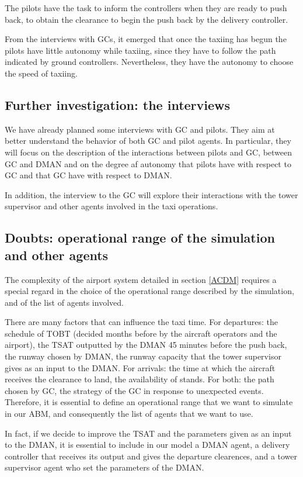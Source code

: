 \documentclass{article}
\begin{document}
The pilots have the task to inform the controllers when they are ready to push back, to obtain the clearance to begin the push back by the delivery controller.

From the interviews with GCs, it emerged that once the taxiing has begun the pilots have little autonomy while taxiing, since they have to follow the path indicated by ground controllers.
Nevertheless, they have the autonomy to choose the speed of taxiing.

\subsection{Further investigation: the interviews}
We have already planned some interviews with GC and pilots. 
They aim at better understand the behavior of both GC and pilot agents. In particular, they will focus on the description of the interactions between pilots and GC, between GC and DMAN and on the degree af autonomy that pilots have with respect to GC and that GC have with respect to DMAN. 

In addition, the interview to the GC will explore their interactions with the tower supervisor and other agents involved in the taxi operations.

\subsection{Doubts: operational range of the simulation and other agents}\label{other-agents}
The complexity of the airport system detailed in section \ref{ACDM} requires a special regard in the choice of the operational range described by the simulation, and of the list of agents involved.

There are many factors that can influence the taxi time. For departures: the schedule of TOBT (decided months before by the aircraft operators and the airport), the TSAT outputted by the DMAN 45 minutes before the push back, the runway chosen by DMAN, the runway capacity that the tower supervisor gives as an input to the DMAN. For arrivals: the time at which the aircraft receives the clearance to land, the availability of stands. For both: the path chosen by GC, the strategy of the GC in response to unexpected events.
Therefore, it is essential to define an operational range that we want to simulate in our ABM, and consequently the list of agents that we want to use. 

In fact, if we decide to improve the TSAT and the parameters given as an input to the DMAN, it is essential to include in our model a DMAN agent, a delivery controller that receives its output and gives the departure clearences, and a tower supervisor agent who set the parameters of the DMAN.
\end{document}
